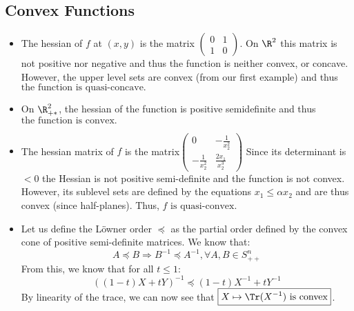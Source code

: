 \documentclass[math, info]{cours}
\begin{document}
\subsection*{Convex Functions}
\begin{itemize}
	\item The hessian of $f$ at $(x,y)$ is the matrix $\begin{pmatrix}
			0 & 1\\
			1 & 0
		\end{pmatrix}$.
		On $\R^{2}$ this matrix is not positive nor negative and thus the function is neither convex, or concave.
However, the upper level sets are convex (from our first example) and thus $\boxed{\text{the function is quasi-concave.}}$
	\item On $\R_{+*}^{2}$, the hessian of the function is positive semidefinite and thus $\boxed{\text{the function is convex.}}$
	\item The hessian matrix of $f$ is the matrix$\begin{pmatrix}
			0 & -\frac{1}{x_{2}^{2}}\\
			-\frac{1}{x_{2}^{2}} & \frac{2x_{1}}{x_{2}^{3}}
		\end{pmatrix}$
		Since its determinant is $<0$ the Hessian is not positive semi-definite and the function is not convex.
		However, its sublevel sets are defined by the equations $x_{1} \leq \alpha x_{2}$ and are thus convex (since half-planes).
		Thus, $\boxed{f \text{ is quasi-convex}}$.
	\item Let us define the Löwner order $\preceq$ as the partial order defined by the convex cone of positive semi-definite matrices.
		We know that:
		\begin{equation*}
			A \preceq B \Rightarrow B^{-1} \preceq A^{-1}, \forall A, B \in S_{++}^{n}
		\end{equation*}
		From this, we know that for all $t \leq 1$:
		\begin{equation*}
			\left( \left( 1 - t \right) X + tY \right)^{-1} \preceq \left( 1 - t \right)X^{-1} + tY^{-1}
		\end{equation*}
		By linearity of the trace, we can now see that $\boxed{X \mapsto \Tr(X^{-1}) \text{ is convex}}$.
\end{itemize}
\end{document}
